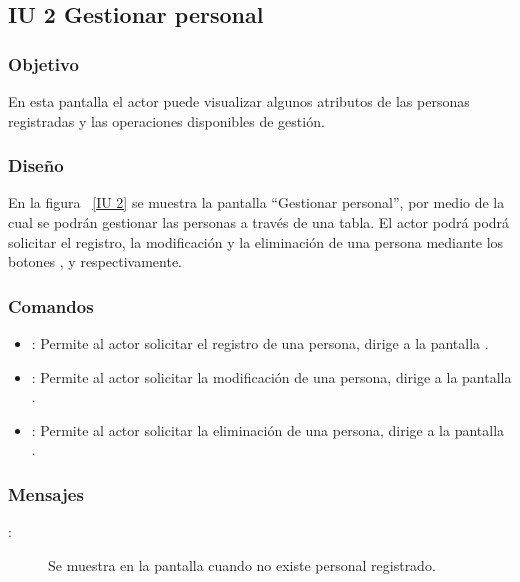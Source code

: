 \subsection{IU 2 Gestionar personal}
\subsubsection{Objetivo}
	
	En esta pantalla el actor puede visualizar algunos atributos de las personas registradas y las operaciones disponibles de gestión.

\subsubsection{Diseño}

    En la figura ~\ref{IU 2} se muestra la pantalla ``Gestionar personal'', por medio de la cual 
    se podrán gestionar las personas a través de una tabla. El actor podrá podrá solicitar el registro, la modificación y la eliminación 
    de una persona mediante los botones
    , \btnEditar y \btnEliminar respectivamente. \\



\subsubsection{Comandos}
\begin{itemize}
	\item {}: Permite al actor solicitar el registro de una persona, dirige a la pantalla .
	\item \btnEditar[Modificar]: Permite al actor solicitar la modificación de una persona, dirige a la pantalla .
	\item \btnEliminar[Eliminar]: Permite al actor solicitar la eliminación de una persona, dirige a la pantalla .
\end{itemize}
\subsubsection{Mensajes}
	
\begin{description}
	\item[:] Se muestra en la pantalla  cuando no existe personal registrado.
\end{description}
